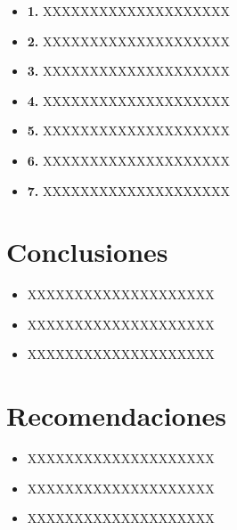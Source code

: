 \documentclass[preprint,12pt]{elsarticle}
\begin{document}
	\begin{itemize}

	\item{\textbf{1.}} XXXXXXXXXXXXXXXXXXXX
	\item{\textbf{2.}} XXXXXXXXXXXXXXXXXXXX
	\item{\textbf{3.}} XXXXXXXXXXXXXXXXXXXX
	\item{\textbf{4.}} XXXXXXXXXXXXXXXXXXXX
	\item{\textbf{5.}} XXXXXXXXXXXXXXXXXXXX
	\item{\textbf{6.}} XXXXXXXXXXXXXXXXXXXX
	\item{\textbf{7.}} XXXXXXXXXXXXXXXXXXXX
	\end{itemize}


\section{Conclusiones}

	\begin{itemize}
		\item XXXXXXXXXXXXXXXXXXXX
		\item XXXXXXXXXXXXXXXXXXXX
		\item XXXXXXXXXXXXXXXXXXXX
	\end{itemize}


\section{Recomendaciones}	

	\begin{itemize}
		\item XXXXXXXXXXXXXXXXXXXX
		\item XXXXXXXXXXXXXXXXXXXX
		\item XXXXXXXXXXXXXXXXXXXX
	\end{itemize}



	
	\newpage
	
		
\end{document}
